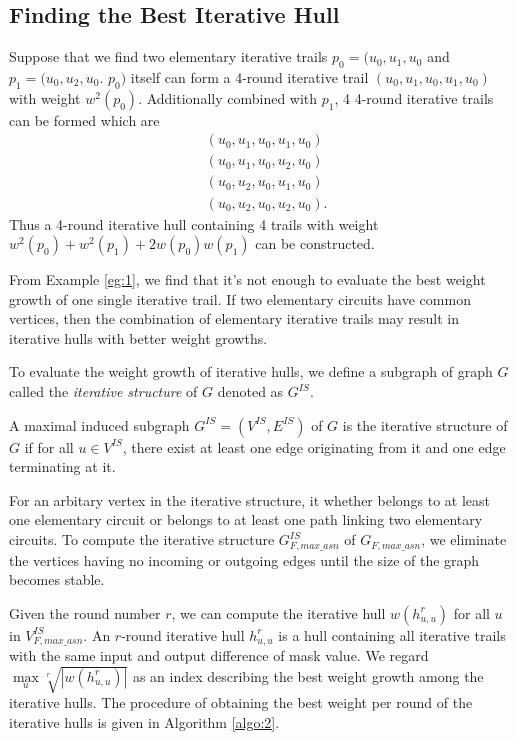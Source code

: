 \subsection{Finding the Best Iterative Hull}\label{sec:fbih}

\begin{example}\label{eg:1}
	Suppose that we find two elementary iterative trails $p_0=(u_0,u_1,u_0$ and $p_1=(u_0,u_2 ,u_0$. $p_0)$ itself can form a 4-round iterative trail $(u_0,u_1,u_0,u_1,u_0)$ with weight $w^2(p_0)$. Additionally combined with $p_1$, 4 4-round iterative trails can be formed which are
	\begin{align*}
		&(u_0,u_1,u_0,u_1,u_0)\\
		&(u_0,u_1,u_0,u_2,u_0)\\
		&(u_0,u_2,u_0,u_1,u_0)\\
		&(u_0,u_2,u_0,u_2,u_0).
	\end{align*}
	Thus a 4-round iterative hull containing 4 trails with weight $w^2(p_0)+w^2(p_1)+2w(p_0)w(p_1)$ can be constructed.
\end{example}

From Example \ref{eg:1}, we find that it's not enough to evaluate the best weight growth of one single iterative trail. If two elementary circuits have common vertices, then the combination of elementary iterative trails may result in iterative hulls with better weight growths.  

To evaluate the weight growth of iterative hulls, we define a subgraph of graph $G$ called the \textit{iterative structure} of $G$ denoted as $G^{IS}$. 

\begin{definition}
	A maximal induced subgraph $G^{IS}=(V^{IS},E^{IS})$ of $G$ is the iterative structure of $G$ if for all $u\in V^{IS}$, there exist at least one edge originating from it and one edge terminating at it.
\end{definition}

For an arbitary vertex in the iterative structure, it whether belongs to at least one elementary circuit or belongs to at least one path linking two elementary circuits. To compute the iterative structure $G^{IS}_{F,max\_asn}$ of $G_{F,max\_asn}$, we eliminate the vertices having no incoming or outgoing edges until the size of the graph becomes stable. 

Given the round number $r$, we can compute the iterative hull $w(h_{u,u}^r)$ for all $u$ in $V^{IS}_{F,max\_asn}$. An $r$-round iterative hull $h_{u,u}^r$ is a hull containing all iterative trails with the same input and output difference of mask value. We regard $\max\limits_{u}\sqrt[r]{|w(h_{u,u}^r)|}$ as an index describing the best weight growth among the iterative hulls. The procedure of obtaining the best weight per round of the iterative hulls is given in Algorithm \ref{algo:2}.



